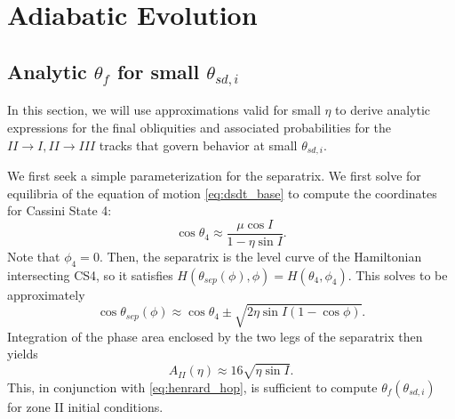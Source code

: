 \documentclass[
        fleqn,
        usenatbib,
    ]{mnras}
\newcommand*{\p}[1]{\left(#1\right)}
\begin{document}



\appendix

\section{Adiabatic Evolution}

\subsection{Analytic $\theta_f$ for small $\theta_{sd,
i}$}\label{ss:app_transition}

In this section, we will use approximations valid for small $\eta$ to derive
analytic expressions for the final obliquities and associated probabilities for
the $II \to I, II \to III$ tracks that govern behavior at small $\theta_{sd,
i}$.

We first seek a simple parameterization for the separatrix. We first solve for
equilibria of the equation of motion \autoref{eq:dsdt_base} to compute the
coordinates for Cassini State 4:
\begin{equation}
    \cos \theta_4 \approx \frac{\mu \cos I}{1 - \eta \sin I}.
\end{equation}
Note that $\phi_4 = 0$. Then, the separatrix is the level curve of the
Hamiltonian intersecting CS4, so it satisfies $H\p{\theta_{sep}(\phi), \phi} =
H\p{\theta_4, \phi_4}$. This solves to be approximately
\begin{equation}
    \cos \theta_{sep}(\phi) \approx \cos \theta_4 \pm
        \sqrt{2\eta \sin I\p{1 - \cos \phi}}.
\end{equation}
Integration of the phase area enclosed by the two legs of the separatrix then
yields
\begin{equation}
    A_{II}(\eta) \approx 16\sqrt{\eta \sin I}.\label{eq:a_approx}
\end{equation}
This, in conjunction with \autoref{eq:henrard_hop}, is sufficient to compute
$\theta_f\p{\theta_{sd, i}}$ for zone II initial conditions.
\end{document}
